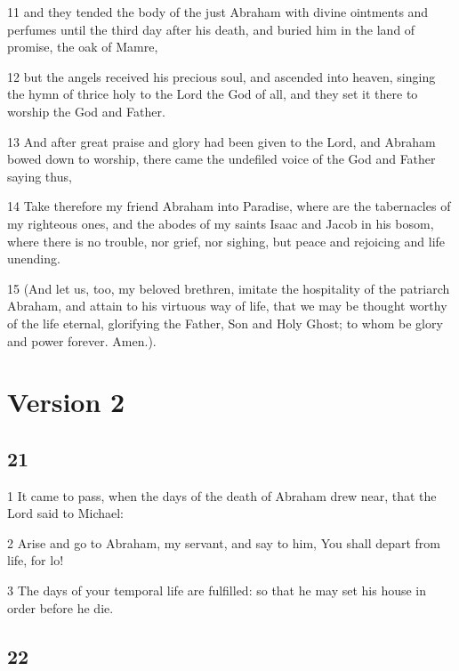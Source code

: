 \par 11 and they tended the body of the just Abraham with divine ointments and perfumes until the third day after his death, and buried him in the land of promise, the oak of Mamre, 

\par 12 but the angels received his precious soul, and ascended into heaven, singing the hymn of thrice holy to the Lord the God of all, and they set it there to worship the God and Father. 

\par 13 And after great praise and glory had been given to the Lord, and Abraham bowed down to worship, there came the undefiled voice of the God and Father saying thus, 

\par 14 Take therefore my friend Abraham into Paradise, where are the tabernacles of my righteous ones, and the abodes of my saints Isaac and Jacob in his bosom, where there is no trouble, nor grief, nor sighing, but peace and rejoicing and life unending. 

\par 15 (And let us, too, my beloved brethren, imitate the hospitality of the patriarch Abraham, and attain to his virtuous way of life, that we may be thought worthy of the life eternal, glorifying the Father, Son and Holy Ghost; to whom be glory and power forever. Amen.).

\part{Version 2}

\chapter{21}

\par 1 It came to pass, when the days of the death of Abraham drew near, that the Lord said to Michael: 

\par 2 Arise and go to Abraham, my servant, and say to him, You shall depart from life, for lo! 

\par 3 The days of your temporal life are fulfilled: so that he may set his house in order before he die.

\chapter{22}

